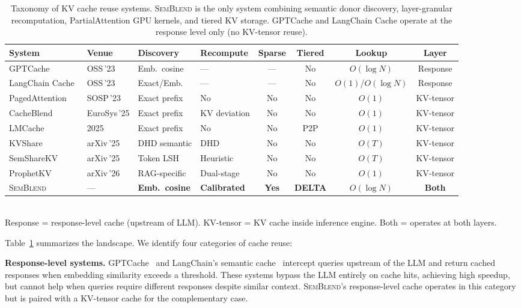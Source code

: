 \documentclass[11pt,twocolumn]{article}
\newcommand{\semblend}{\textsc{SemBlend}\xspace}
\begin{document}
\begin{table}[t]
\centering
\caption{Taxonomy of KV cache reuse systems. \semblend is the only system
combining semantic donor discovery, layer-granular recomputation,
PartialAttention GPU kernels, and tiered KV storage. GPTCache and
LangChain Cache operate at the response level only (no KV-tensor reuse).}
\label{tab:taxonomy}
\scriptsize
\setlength{\tabcolsep}{2.5pt}
\begin{tabular}{@{}llllcccc@{}}
\toprule
\textbf{System} & \textbf{Venue} & \textbf{Discovery} & \textbf{Recompute} &
  \textbf{Sparse} & \textbf{Tiered} & \textbf{Lookup} & \textbf{Layer} \\
\midrule
GPTCache~\cite{gptcache} & OSS\,'23 & Emb.\ cosine & --- & --- & No & $O(\log N)$ & Response \\
LangChain Cache~\cite{langchain} & OSS\,'23 & Exact/Emb. & --- & --- & No & $O(1)$/$O(\log N)$ & Response \\
PagedAttention~\cite{pagedattention} & SOSP\,'23 & Exact prefix & No & No & No & $O(1)$ & KV-tensor \\
CacheBlend~\cite{cacheblend} & EuroSys\,'25 & Exact prefix & KV deviation & No & No & $O(1)$ & KV-tensor \\
LMCache~\cite{lmcache} & 2025 & Exact prefix & No & No & P2P & $O(1)$ & KV-tensor \\
KVShare~\cite{kvshare} & arXiv\,'25 & DHD semantic & DHD & No & No & $O(T)$ & KV-tensor \\
SemShareKV~\cite{semsharekv} & arXiv\,'25 & Token LSH & Heuristic & No & No & $O(T)$ & KV-tensor \\
ProphetKV~\cite{prophetkv} & arXiv\,'26 & RAG-specific & Dual-stage & No & No & $O(1)$ & KV-tensor \\
\midrule
\semblend & --- & \textbf{Emb.\ cosine} & \textbf{Calibrated} &
  \textbf{Yes} & \textbf{DELTA} & $O(\log N)$ & \textbf{Both} \\
\bottomrule
\end{tabular}\\[2pt]
{\footnotesize Response = response-level cache (upstream of LLM).
KV-tensor = KV cache inside inference engine. Both = operates at
both layers.}
\end{table}

Table~\ref{tab:taxonomy} summarizes the landscape. We identify four
categories of cache reuse:

\textbf{Response-level systems.}
GPTCache~\cite{gptcache} and LangChain's semantic cache~\cite{langchain}
intercept queries upstream of the LLM and return cached responses when
embedding similarity exceeds a threshold. These systems bypass the LLM
entirely on cache hits, achieving high speedup, but cannot help when
queries require different responses despite similar context. \semblend's
response-level cache operates in this category but is paired with a
KV-tensor cache for the complementary case.
\end{document}
